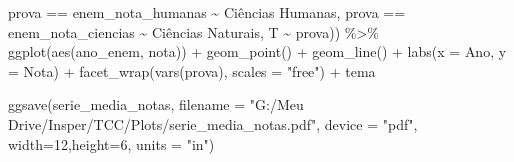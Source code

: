 \documentclass[
  letterpaper,
  DIV=11,
  numbers=noendperiod]{scrartcl}
\newenvironment{Shaded}{\begin{snugshade}}{\end{snugshade}}
\newcommand{\AttributeTok}[1]{\textcolor[rgb]{0.40,0.45,0.13}{#1}}
\newcommand{\DecValTok}[1]{\textcolor[rgb]{0.68,0.00,0.00}{#1}}
\newcommand{\FunctionTok}[1]{\textcolor[rgb]{0.28,0.35,0.67}{#1}}
\newcommand{\NormalTok}[1]{\textcolor[rgb]{0.00,0.23,0.31}{#1}}
\newcommand{\SpecialCharTok}[1]{\textcolor[rgb]{0.37,0.37,0.37}{#1}}
\newcommand{\StringTok}[1]{\textcolor[rgb]{0.13,0.47,0.30}{#1}}
\begin{document}
\begin{Shaded}
\begin{Highlighting}[]
\NormalTok{                           prova }\SpecialCharTok{==} \StringTok{\textquotesingle{}enem\_nota\_humanas\textquotesingle{}} \SpecialCharTok{\textasciitilde{}} \StringTok{\textquotesingle{}Ciências Humanas\textquotesingle{}}\NormalTok{,}
\NormalTok{                           prova }\SpecialCharTok{==} \StringTok{\textquotesingle{}enem\_nota\_ciencias\textquotesingle{}} \SpecialCharTok{\textasciitilde{}} \StringTok{\textquotesingle{}Ciências Naturais\textquotesingle{}}\NormalTok{,}
\NormalTok{                           T }\SpecialCharTok{\textasciitilde{}}\NormalTok{ prova)) }\SpecialCharTok{\%\textgreater{}\%} 
  \FunctionTok{ggplot}\NormalTok{(}\FunctionTok{aes}\NormalTok{(ano\_enem, nota)) }\SpecialCharTok{+}
  \FunctionTok{geom\_point}\NormalTok{() }\SpecialCharTok{+}
  \FunctionTok{geom\_line}\NormalTok{() }\SpecialCharTok{+} 
  \FunctionTok{labs}\NormalTok{(}\AttributeTok{x =} \StringTok{\textquotesingle{}Ano\textquotesingle{}}\NormalTok{, }\AttributeTok{y =} \StringTok{\textquotesingle{}Nota\textquotesingle{}}\NormalTok{) }\SpecialCharTok{+}
  \FunctionTok{facet\_wrap}\NormalTok{(}\FunctionTok{vars}\NormalTok{(prova), }\AttributeTok{scales =} \StringTok{"free"}\NormalTok{) }\SpecialCharTok{+}
\NormalTok{  tema}

\FunctionTok{ggsave}\NormalTok{(serie\_media\_notas, }
       \AttributeTok{filename =} \StringTok{"G:/Meu Drive/Insper/TCC/Plots/serie\_media\_notas.pdf"}\NormalTok{,}
       \AttributeTok{device =} \StringTok{"pdf"}\NormalTok{,}
       \AttributeTok{width=}\DecValTok{12}\NormalTok{,}\AttributeTok{height=}\DecValTok{6}\NormalTok{, }\AttributeTok{units =} \StringTok{"in"}\NormalTok{)}


\end{Highlighting}
\end{Shaded}
\end{document}
